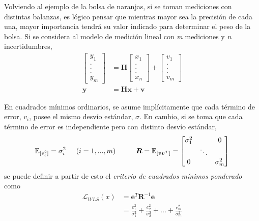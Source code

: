 Volviendo al ejemplo de la bolsa de naranjas, si se toman mediciones con distintas balanzas, es lógico pensar que mientras mayor sea la precisión de cada una, mayor importancia tendrá su valor indicado para determinar el peso de la bolsa. Si se considera al modelo de medición lineal con \textit{m} mediciones y \textit{n} incertidumbres,
\begin{align}
    \begin{bmatrix}
        y_1 \\ . \\ . \\ . \\ y_m
    \end{bmatrix}
    &=
    \bm{H}
    \begin{bmatrix}
        x_1 \\ . \\ . \\ . \\ x_n
    \end{bmatrix}
    +
    \begin{bmatrix}
        v_1 \\ .\\ . \\ . \\ v_m
    \end{bmatrix} \\
    \bm{y} &= \bm{H} \bm{x} + \bm{v}
\end{align}

En cuadrados mínimos ordinarios, se asume implícitamente que cada término de error, $v_i$, posee el mismo desvío estándar, $\sigma$. En cambio, si se toma que cada término de error es independiente pero con distinto desvío estándar,
\begin{equation}
    \mathbb{E}_{[v_i^2]} = \sigma_i^2 \hspace{0.5cm}(i=1,...,m)\hspace{1cm}\bm{R}=\mathbb{E}_{[\bm{v}\bm{v}^T]} = 
    \begin{bmatrix}
        \sigma_1^2  &        &     0      \\
                    & \ddots &            \\
            0       &        & \sigma_m^2
    \end{bmatrix}
\end{equation}
se puede definir a partir de esto el \textit{criterio de cuadrados mínimos ponderado} como
\begin{align}
    \mathscr{L}_{WLS}(x) &= \bm{e}^T\bm{R}^{-1}\bm{e} \\
                         &= \frac{e_1^2}{\sigma_1^2} + \frac{e_2^2}{\sigma_2^2} + ... + \frac{e_m^2}{\sigma_m^2}
\end{align}

